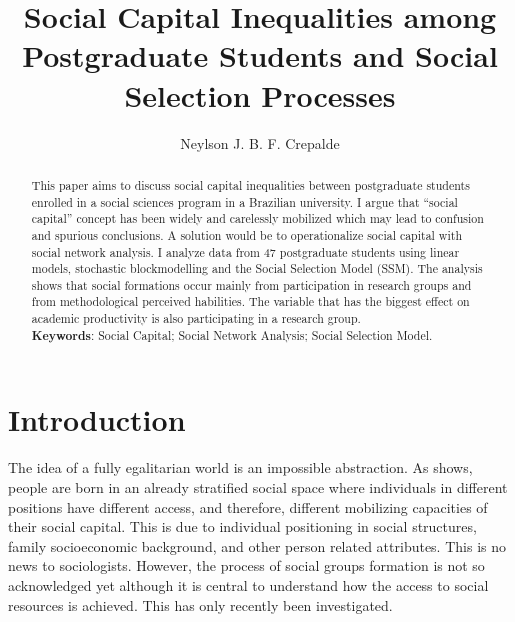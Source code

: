 \documentclass[12pt, english]{article}
\title{Social Capital Inequalities among Postgraduate Students and Social Selection Processes}
\author{Neylson J. B. F. Crepalde\inst{1}}
\begin{document}
 

\maketitle

\begin{abstract}
  This paper aims to discuss social capital inequalities between postgraduate students enrolled in a social sciences program in a Brazilian university. I argue that ``social capital'' concept has been widely and carelessly mobilized which may lead to confusion and spurious conclusions. A solution would be to operationalize social capital with social network analysis. I analyze data from 47 postgraduate students using linear models, stochastic blockmodelling and the Social Selection Model (SSM). The analysis shows that social formations occur mainly from participation in research groups and from methodological perceived habilities. The variable that has the biggest effect on academic productivity is also participating in a research group.
  \\
  \textbf{Keywords}: Social Capital; Social Network Analysis; Social Selection Model.
\end{abstract}
     


\section{Introduction}

The idea of a fully egalitarian world is an impossible abstraction. As \cite{lin1999building} shows, people are born in an already stratified social space where individuals in different positions have different access, and therefore, different mobilizing capacities of their social capital. This is due to individual positioning in social structures, family socioeconomic background, and other person related attributes. This is no news to sociologists. However, the process of social groups formation is not so acknowledged yet although it is central to understand how the access to social resources is achieved. This has only recently been investigated.
\end{document}
